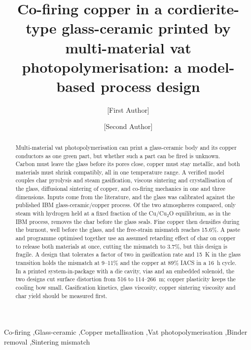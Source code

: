 \begin{frontmatter}

\title{Co-firing copper in a cordierite-type glass-ceramic printed by multi-material vat photopolymerisation: a model-based process design}

\author[aff1]{[First Author]}
\author[aff1]{[Second Author]}

\begin{abstract}
Multi-material vat photopolymerisation can print a glass-ceramic body and its copper conductors as one green part, but whether such a part can be fired is unknown. Carbon must leave the glass before its pores close, copper must stay metallic, and both materials must shrink compatibly, all in one temperature range. A verified model couples char pyrolysis and steam gasification, viscous sintering and crystallisation of the glass, diffusional sintering of copper, and co-firing mechanics in one and three dimensions. Inputs come from the literature, and the glass was calibrated against the published IBM glass-ceramic/copper process. Of the two atmospheres compared, only steam with hydrogen held at a fixed fraction of the Cu/Cu$_2$O equilibrium, as in the IBM process, removes the char before the glass seals. Fine copper then densifies during the burnout, well before the glass, and the free-strain mismatch reaches 15.6\%. A paste and programme optimised together use an assumed retarding effect of char on copper to release both materials at once, cutting the mismatch to 3.7\%, but this design is fragile. A design that tolerates a factor of two in gasification rate and 15~K in the glass transition holds the mismatch at 9--11\% and the copper at 89\% IACS in a 16~h cycle. In a printed system-in-package with a die cavity, vias and an embedded solenoid, the two designs cut surface distortion from 516 to 114--266~\textmu m; copper plasticity keeps the cooling bow small. Gasification kinetics, glass viscosity, copper sintering viscosity and char yield should be measured first.
\end{abstract}

\begin{keyword}
Co-firing \sep Glass-ceramic \sep Copper metallisation \sep Vat photopolymerisation \sep Binder removal \sep Sintering mismatch
\end{keyword}

\end{frontmatter}
